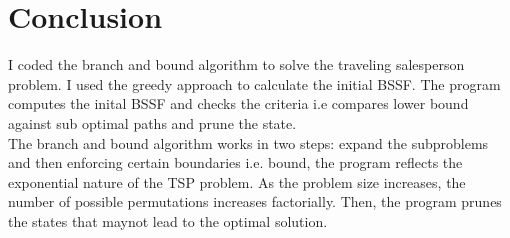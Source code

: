 \documentclass[12pt]{article}
\begin{document}
\section{Conclusion}
I coded the branch and bound algorithm to solve the traveling salesperson problem. I used the greedy approach to calculate the initial BSSF. The program computes the inital BSSF 
and checks the criteria i.e compares lower bound against sub optimal paths and prune the state. \\
The branch and bound algorithm works in two steps: expand the subproblems and then enforcing 
certain boundaries i.e. bound,  the program reflects the exponential nature of the TSP problem. As the problem size increases, the number of possible permutations increases factorially.
Then, the program prunes the states that maynot lead to the optimal solution.
\end{document}

